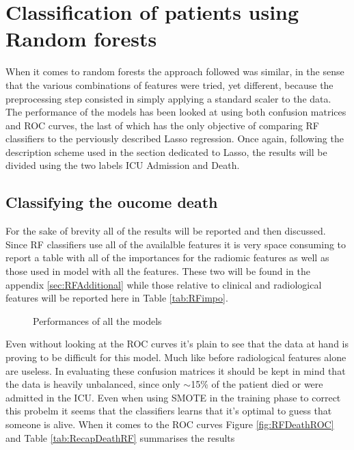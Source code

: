\section{Classification of patients using Random forests}
When it comes to random forests the approach followed was similar, in the sense that the various combinations of features were tried, yet different, because the preprocessing step consisted in simply applying a standard scaler to the data. The performance of the models has been looked at using both confusion matrices and ROC curves, the last of which has the only objective of comparing RF classifiers to the perviously described Lasso regression. Once again, following the description scheme used in the section dedicated to Lasso, the results will be divided using the two labels ICU Admission and Death.

\subsection{Classifying the oucome death}
For the sake of brevity all of the results will be reported and then discussed. Since RF classifiers use all of the availalble features it is very space consuming to report a table with all of the importances for the radiomic features as well as those used in model with all the features. These two will be found in the appendix \ref{sec:RFAdditional} while those relative to clinical and radiological features will be reported here in Table \ref{tab:RFimpo}.

\begin{figure}[H]
\centering
	\newline
        \caption{Performances of all the models}\label{fig:RFDeath}
\end{figure}

Even without looking at the ROC curves it's plain to see that the data at hand is proving to be difficult for this model. Much like before radiological features alone are useless. In evaluating these confusion matrices it should be kept in mind that the data is heavily unbalanced, since only $\sim$15\% of the patient died or were admitted in the ICU. Even when using SMOTE in the training phase to correct this probelm it seems that the classifiers learns that it's optimal to guess that someone is alive. When it comes to the ROC curves Figure \ref{fig:RFDeathROC} and Table \ref{tab:RecapDeathRF} summarises the results


